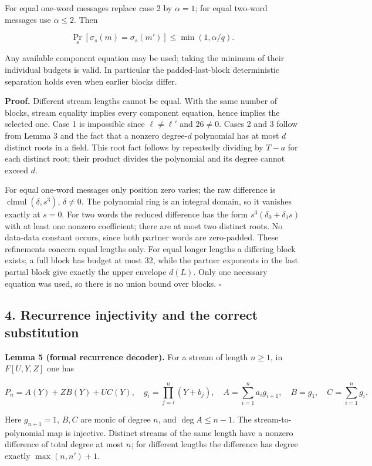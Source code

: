 \documentclass[
  11pt,
]{article}
\begin{document}
For equal one-word messages replace case 2 by \(\alpha=1\); for equal
two-word messages use \(\alpha\le2\). Then

\[ \Pr_s[\sigma_s(m)=\sigma_s(m')]\le\min(1,\alpha/q). \]

Any available component equation may be used; taking the minimum of
their individual budgets is valid. In particular the padded-last-block
deterministic separation holds even when earlier blocks differ.

\textbf{Proof.} Different stream lengths cannot be equal. With the same
number of blocks, stream equality implies every component equation,
hence implies the selected one. Case 1 is impossible since
\(\ell\ne\ell'\) and \(26\ne0\). Cases 2 and 3 follow from Lemma 3 and
the fact that a nonzero degree-\(d\) polynomial has at most \(d\)
distinct roots in a field. This root fact follows by repeatedly dividing
by \(T-a\) for each distinct root; their product divides the polynomial
and its degree cannot exceed \(d\).

For equal one-word messages only position zero varies; the raw
difference is \(\operatorname{clmul}(\delta,s^3)\), \(\delta\ne0\). The
polynomial ring is an integral domain, so it vanishes exactly at
\(s=0\). For two words the reduced difference has the form
\(s^3(\delta_0+\delta_1s)\) with at least one nonzero coefficient; there
are at most two distinct roots. No data-data constant occurs, since both
partner words are zero-padded. These refinements concern equal lengths
only. For equal longer lengths a differing block exists; a full block
has budget at most 32, while the partner exponents in the last partial
block give exactly the upper envelope \(d(L)\). Only one necessary
equation was used, so there is no union bound over blocks. \(\square\)

\subsection{4. Recurrence injectivity and the correct
substitution}\label{recurrence-injectivity-and-the-correct-substitution}

\textbf{Lemma 5 (formal recurrence decoder).} For a stream of length
\(n\ge1\), in \(F[U,Y,Z]\) one has

\[
 P_n=A(Y)+Z B(Y)+U C(Y),\quad
 g_i=\prod_{j=i}^n(Y+b_j),\quad
 A=\sum_{i=1}^n a_i g_{i+1},\quad B=g_1,\quad C=\sum_{i=1}^n g_i.
\]

Here \(g_{n+1}=1\), \(B,C\) are monic of degree \(n\), and
\(\deg A\le n-1\). The stream-to-polynomial map is injective. Distinct
streams of the same length have a nonzero difference of total degree at
most \(n\); for different lengths the difference has degree exactly
\(\max(n,n')+1\).
\end{document}
